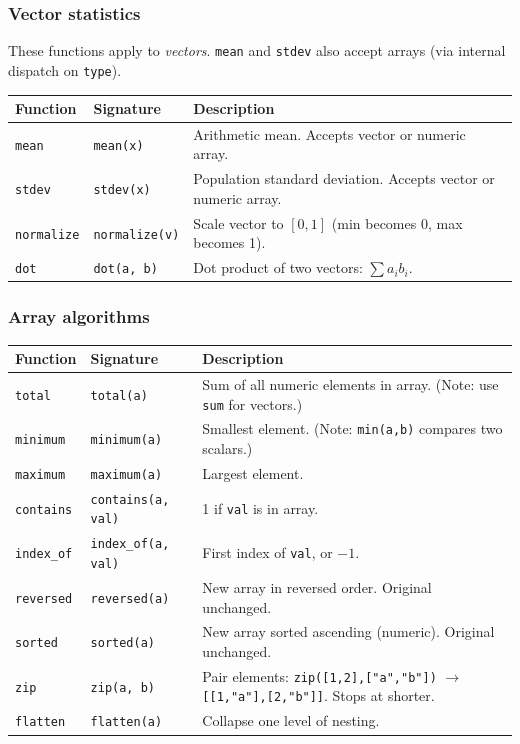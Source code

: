 \documentclass[11pt,a4paper]{article}
\begin{document}
\subsubsection{Vector statistics}

These functions apply to \emph{vectors}. \texttt{mean} and \texttt{stdev} also
accept arrays (via internal dispatch on \texttt{type}).

\begin{longtable}{@{}L{3.5cm}L{3.8cm}L{7.2cm}@{}}
\toprule
\textbf{Function} & \textbf{Signature} & \textbf{Description} \\
\midrule
\endhead
\texttt{mean}       & \texttt{mean(x)}        & Arithmetic mean. Accepts vector or numeric array. \\
\texttt{stdev}      & \texttt{stdev(x)}       & Population standard deviation. Accepts vector or numeric array. \\
\texttt{normalize}  & \texttt{normalize(v)}   & Scale vector to $[0, 1]$ (min becomes 0, max becomes 1). \\
\texttt{dot}        & \texttt{dot(a, b)}      & Dot product of two vectors: $\sum a_i b_i$. \\
\bottomrule
\end{longtable}

\subsubsection{Array algorithms}

\begin{longtable}{@{}L{3.5cm}L{4cm}L{7cm}@{}}
\toprule
\textbf{Function} & \textbf{Signature} & \textbf{Description} \\
\midrule
\endhead
\texttt{total}      & \texttt{total(a)}           & Sum of all numeric elements in array. (Note: use \texttt{sum} for vectors.) \\
\texttt{minimum}    & \texttt{minimum(a)}         & Smallest element. (Note: \texttt{min(a,b)} compares two scalars.) \\
\texttt{maximum}    & \texttt{maximum(a)}         & Largest element. \\
\texttt{contains}   & \texttt{contains(a, val)}   & 1 if \texttt{val} is in array. \\
\texttt{index\_of}  & \texttt{index\_of(a, val)}  & First index of \texttt{val}, or $-1$. \\
\texttt{reversed}   & \texttt{reversed(a)}        & New array in reversed order. Original unchanged. \\
\texttt{sorted}     & \texttt{sorted(a)}          & New array sorted ascending (numeric). Original unchanged. \\
\texttt{zip}        & \texttt{zip(a, b)}          & Pair elements: \texttt{zip([1,2],["a","b"])} $\to$ \texttt{[[1,"a"],[2,"b"]]}. Stops at shorter. \\
\texttt{flatten}    & \texttt{flatten(a)}         & Collapse one level of nesting. \\
\bottomrule
\end{longtable}
\end{document}
